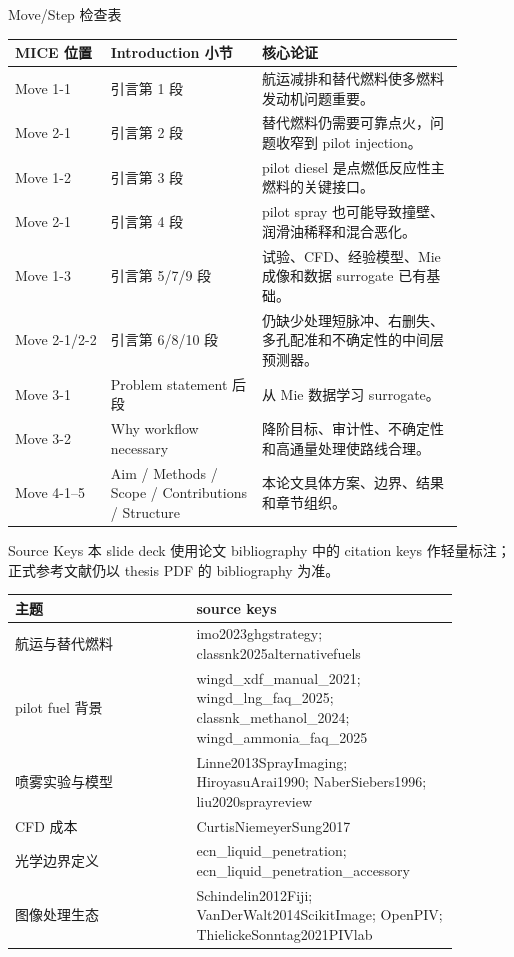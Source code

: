 \documentclass[aspectratio=169,11pt]{beamer}
\begin{document}
\begin{frame}{Move/Step 检查表}
\footnotesize
\begin{tabular}{L{0.19\linewidth}L{0.30\linewidth}L{0.40\linewidth}}
\toprule
MICE 位置 & Introduction 小节 & 核心论证 \\
\midrule
Move 1-1 & 引言第 1 段 & 航运减排和替代燃料使多燃料发动机问题重要。 \\
Move 2-1 & 引言第 2 段 & 替代燃料仍需要可靠点火，问题收窄到 pilot injection。 \\
Move 1-2 & 引言第 3 段 & pilot diesel 是点燃低反应性主燃料的关键接口。 \\
Move 2-1 & 引言第 4 段 & pilot spray 也可能导致撞壁、润滑油稀释和混合恶化。 \\
Move 1-3 & 引言第 5/7/9 段 & 试验、CFD、经验模型、Mie 成像和数据 surrogate 已有基础。 \\
Move 2-1/2-2 & 引言第 6/8/10 段 & 仍缺少处理短脉冲、右删失、多孔配准和不确定性的中间层预测器。 \\
Move 3-1 & Problem statement 后段 & 从 Mie 数据学习 surrogate。 \\
Move 3-2 & Why workflow necessary & 降阶目标、审计性、不确定性和高通量处理使路线合理。 \\
Move 4-1--5 & Aim / Methods / Scope / Contributions / Structure & 本论文具体方案、边界、结果和章节组织。 \\
\bottomrule
\end{tabular}
\end{frame}

\begin{frame}{Source Keys}
\small
本 slide deck 使用论文 bibliography 中的 citation keys 作轻量标注；正式参考文献仍以 thesis PDF 的 bibliography 为准。

\vspace{0.7em}
\begin{tabular}{L{0.36\linewidth}L{0.52\linewidth}}
\toprule
主题 & source keys \\
\midrule
航运与替代燃料 & imo2023ghgstrategy; classnk2025alternativefuels \\
pilot fuel 背景 & wingd\_xdf\_manual\_2021; wingd\_lng\_faq\_2025; classnk\_methanol\_2024; wingd\_ammonia\_faq\_2025 \\
喷雾实验与模型 & Linne2013SprayImaging; HiroyasuArai1990; NaberSiebers1996; liu2020sprayreview \\
CFD 成本 & CurtisNiemeyerSung2017 \\
光学边界定义 & ecn\_liquid\_penetration; ecn\_liquid\_penetration\_accessory \\
图像处理生态 & Schindelin2012Fiji; VanDerWalt2014ScikitImage; OpenPIV; ThielickeSonntag2021PIVlab \\
\bottomrule
\end{tabular}
\end{frame}
\end{document}

